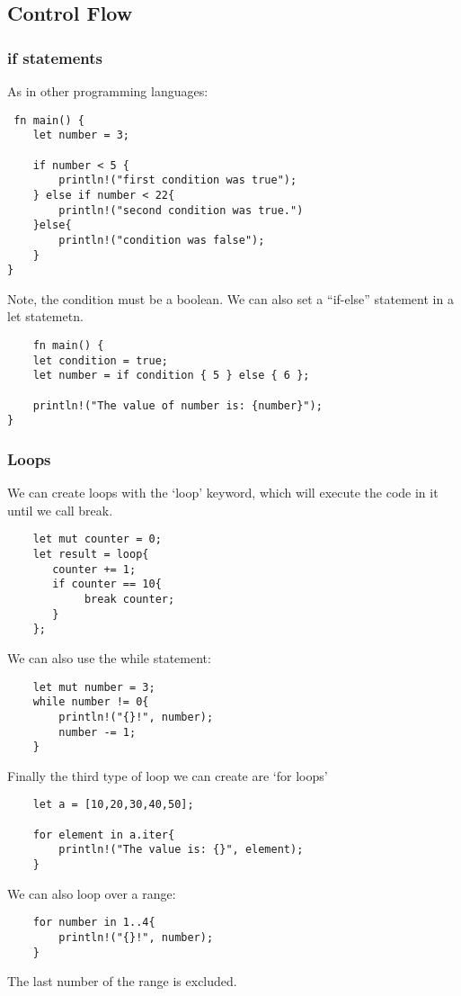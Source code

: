 \subsection{Control Flow}
\subsubsection{if statements}
As in other programming languages:\begin{lstlisting}
 fn main() {
    let number = 3;

    if number < 5 {
        println!("first condition was true");
    } else if number < 22{
        println!("second condition was true.")
    }else{
        println!("condition was false");
    }
}
\end{lstlisting}
Note, the condition must be a boolean. We can also set a ``if-else'' statement in a let statemetn.\begin{lstlisting}
    fn main() {
    let condition = true;
    let number = if condition { 5 } else { 6 };

    println!("The value of number is: {number}");
}
\end{lstlisting}
\subsubsection{Loops}
We can create loops with the `loop' keyword, which will execute the code in it until we call break.\begin{lstlisting}
    let mut counter = 0;
    let result = loop{
       counter += 1;
       if counter == 10{
            break counter;
       }
    };
\end{lstlisting}

We can also use the while statement:\begin{lstlisting}
    let mut number = 3;
    while number != 0{
        println!("{}!", number);
        number -= 1;
    }
\end{lstlisting}

Finally the third type of loop we can create are `for loops'\begin{lstlisting}
    let a = [10,20,30,40,50];
    
    for element in a.iter{
        println!("The value is: {}", element);
    }
\end{lstlisting}

We can also loop over a range:\begin{lstlisting}
    for number in 1..4{
        println!("{}!", number);
    }
\end{lstlisting}
The last number of the range is excluded.
